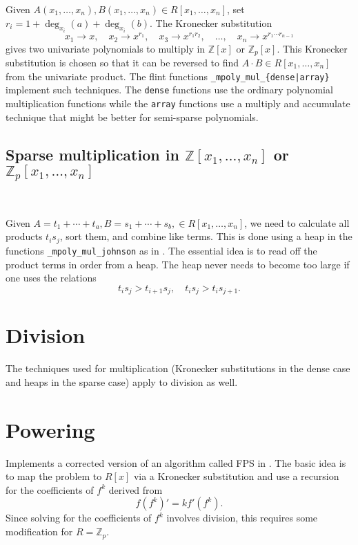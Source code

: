 \documentclass[11pt,reqno]{amsart}
\numberwithin{equation}{section}
\newcommand{\op}[1]  { \operatorname{ #1 }}
\newcommand{\bbZ}[0]  { \mathbb{Z}}
\begin{document}
Given $A(x_1,\dots,x_n), B(x_1,\dots,x_n) \in R[x_1,\dots,x_n]$, set $r_i = 1 + \op{deg}_{x_i}(a) + \op{deg}_{x_i}(b)$. The Kronecker substitution
\begin{equation*}
x_1 \to x, \quad x_2 \to x^{r_1}, \quad x_3 \to x^{r_1 r_2}, \quad \dots, \quad x_n \to x^{r_1 \cdots r_{n-1}}
\end{equation*}
gives two univariate polynomials to multiply in $\bbZ[x]$ or $\bbZ_p[x]$. This Kronecker substitution is chosen so that it can be reversed to find $A \cdot B \in R[x_1,\dots,x_n]$ from the univariate product. The flint functions {\tt \_mpoly\_mul\_\{dense|array\}} implement such techniques. The {\tt dense} functions use the ordinary polynomial multiplication functions while the {\tt array} functions use a multiply and accumulate technique that might be better for semi-sparse polynomials.

\subsection{Sparse multiplication in $\bbZ[x_1,\dots,x_n]$ or $\bbZ_p[x_1,\dots,x_n]$}\

Given $A = t_1 + \cdots + t_a, B = s_1 + \cdots + s_b, \in R[x_1,\dots,x_n]$, we need to calculate all products $t_i s_j$, sort them, and combine like terms. This is done using a heap in the functions {\tt \_mpoly\_mul\_johnson} as in \cite{Johnson}. The essential idea is to read off the product terms in order from a heap. The heap never needs to become too large if one uses the relations
\begin{equation*}
t_i s_j > t_{i+1} s_j, \quad t_i s_j > t_i s_{j+1}\text{.}
\end{equation*}


\section{Division}

The techniques used for multiplication (Kronecker substitutions in the dense case and heaps in the sparse case) apply to division as well.


\section{Powering}

Implements a corrected version of an algorithm called FPS in \cite{FPS}. The basic idea is to map the problem to $R[x]$ via a Kronecker substitution and use a recursion for the coefficients of $f^k$ derived from
\begin{equation*}
f (f^k)' = k f' (f^k)\text{.}
\end{equation*}
Since solving for the coefficients of $f^k$ involves division, this requires some modification for $R=\bbZ_p$.
\end{document}
